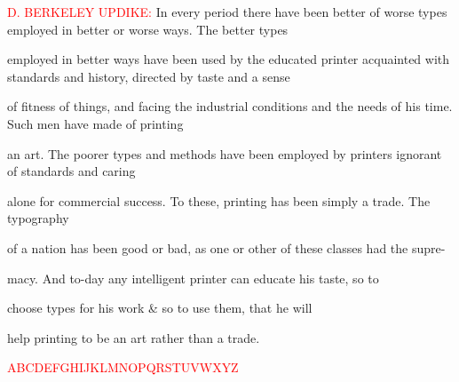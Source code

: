 \documentclass{memoir}
\begin{document}
\setlength{\parfillskip}{0pt}
{\noindent \rightpointright \fontsize{6}{7}\selectfont
  \textcolor{red}{\MakeUppercase{D. Berkeley Updike:}} In every period
  there have been better of worse types employed in better or worse
  ways. The better types}

{\noindent\fontsize{8}{9}\selectfont employed in better ways have been used
  by the educated printer acquainted with standards and history,
  directed by taste and a sense}

{\noindent \small of fitness of things, and facing the
  industrial conditions and the needs of his time. Such men have made
  of printing}

{\noindent \normalsize an art. The poorer types and methods
  have been employed by printers ignorant of standards and caring}

{\noindent \fontsize{11}{16}\selectfont alone for commercial
  success. To these, printing has been simply a trade. The typography
  }

{\noindent \fontsize{12}{18}\selectfont of a nation has been good or bad, as one or
  other of these classes had the supre-}

{\noindent \LARGE macy. And to-day any intelligent printer can educate his
taste, so to}

{\noindent \huge choose types for his work \& so to use them, that he will}

{\noindent \Huge help printing to be an art rather than a
trade.}

{\noindent \Huge \textcolor{red}{ABCDEFGHIJKLMNOPQRSTUVWXYZ}}
\end{document}
